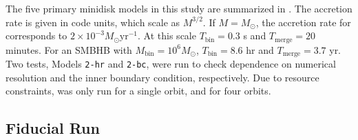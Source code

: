 

The five primary minidisk models in this study are summarized in .  The accretion rate is given in code units, which scale as $M^{3/2}$.  If $M=M_{\odot}$, the accretion rate for  corresponds to $2\times10^{-3} M_{\odot} \text{yr}^{-1}$.  At this scale $T_\text{bin} = 0.3$ s and $T_\text{merge} = 20$ minutes.  For an SMBHB with $M_\text{bin} = 10^6 M_{\odot}$, $T_\text{bin} = 8.6$ hr and $T_\text{merge} = 3.7$ yr.  Two tests, Models \texttt{2-hr} and \texttt{2-bc}, were run to check dependence on numerical resolution and the inner boundary condition, respectively. Due to resource constraints,  was only run for a single orbit, and  for four orbits.

\subsection{Fiducial Run}

